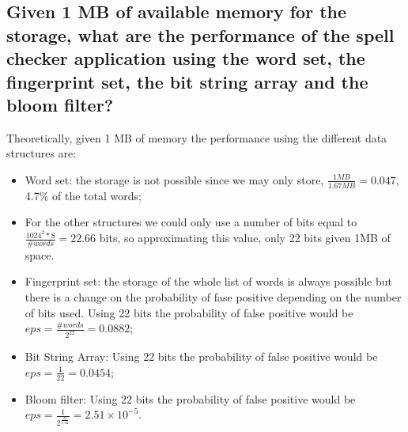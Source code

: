 \documentclass{report}
\begin{document}
				\subsection{Given 1 MB of available memory for the storage, what are the performance of the spell checker application using the word set, the fingerprint set, the bit string array and the bloom filter?}
				Theoretically, given 1 MB of memory the performance using the different data structures are:
				\begin{itemize}
					\item Word set: the storage is not possible since we may only store, $\frac{1MB}{1.67MB}=0.047$, 4.7\% of the total words;
					\item[] For the other structures we could only use a number of bits equal to $\frac{1024^2*8}{\#words}=22.66$ bits, so approximating this value, only 22 bits given 1MB of space.
					\item Fingerprint set: the storage of the whole list of words is always possible but there is a change on the probability of fase positive depending on the number of bits used. Using 22 bits the probability of false positive would be $eps=\frac{\#words}{2^{22}}=0.0882$; 
					\item Bit String Array: Using 22 bits the probability of false positive would be $eps=\frac{1}{22}=0.0454$;
					\item Bloom filter: Using 22 bits the probability of false positive would be $eps=\frac{1}{2^{\frac{22}{1.44}}}=2.51 \times 10^{-5}$. 
				\end{itemize}
				
\end{document}
